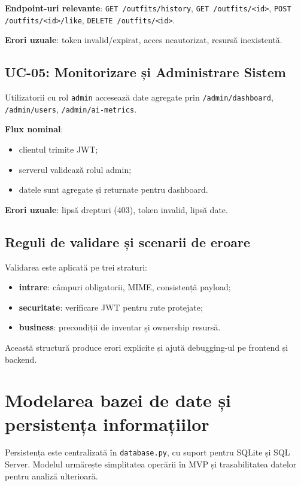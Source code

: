 \textbf{Endpoint-uri relevante}: \texttt{GET /outfits/history}, \texttt{GET /outfits/<id>}, \texttt{POST /outfits/<id>/like}, \texttt{DELETE /outfits/<id>}.

\textbf{Erori uzuale}: token invalid/expirat, acces neautorizat, resursă inexistentă.

\subsection*{UC-05: Monitorizare și Administrare Sistem}
Utilizatorii cu rol \texttt{admin} accesează date agregate prin \texttt{/admin/dashboard}, \texttt{/admin/users}, \texttt{/admin/ai-metrics}.

\textbf{Flux nominal}:
\begin{itemize}
    \item clientul trimite JWT;
    \item serverul validează rolul admin;
    \item datele sunt agregate și returnate pentru dashboard.
\end{itemize}

\textbf{Erori uzuale}: lipsă drepturi (403), token invalid, lipsă date.

\subsection{Reguli de validare și scenarii de eroare}

Validarea este aplicată pe trei straturi:
\begin{itemize}
    \item \textbf{intrare}: câmpuri obligatorii, MIME, consistență payload;
    \item \textbf{securitate}: verificare JWT pentru rute protejate;
    \item \textbf{business}: precondiții de inventar și ownership resursă.
\end{itemize}

Această structură produce erori explicite și ajută debugging-ul pe frontend și backend.

\section{Modelarea bazei de date și persistența informațiilor}

Persistența este centralizată în \texttt{database.py}, cu suport pentru SQLite și SQL Server. Modelul urmărește simplitatea operării în MVP și trasabilitatea datelor pentru analiză ulterioară.

